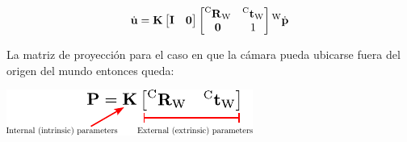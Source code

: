 \begin{frame}
       \begin{equation*}
        \dot{\boldsymbol{\mathbf{u}}}=\boldsymbol{\mathbf{K}}\begin{bmatrix} \boldsymbol{\mathbf{I}} & \boldsymbol{\mathbf{0}}\end{bmatrix} \begin{bmatrix}
            \prescript{\mathrm{\mathrm{C}}}{}{{\boldsymbol{\mathbf{R}}}_\mathrm{\mathrm{W}}} & \prescript{\mathrm{\mathrm{C}}}{}{{\boldsymbol{\mathbf{t}}}_\mathrm{\mathrm{W}}} \\
            \boldsymbol{\mathbf{0}} & 1
        \end{bmatrix}
        \prescript{\mathrm{\mathrm{W}}}{}{\dot{\boldsymbol{\mathbf{p}}}}
    \end{equation*}
    
    La matriz de proyección para el caso en que la cámara pueda ubicarse fuera del origen del mundo entonces queda:
    

    \begin{center}
        \includegraphics[width=0.4\columnwidth]{images/camera/projection_matrix.pdf}
    \end{center}

\end{frame}

